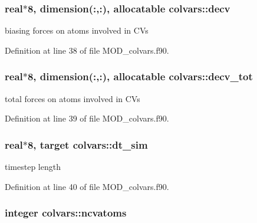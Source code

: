 \hypertarget{classcolvars_aae9ea8e5b352351931e03775fc3971e2}{
\subsubsection[{decv}]{\setlength{\rightskip}{0pt plus 5cm}real$\ast$8, dimension(\-:,\-:), allocatable colvars\-::decv}}\label{classcolvars_aae9ea8e5b352351931e03775fc3971e2}


biasing forces on atoms involved in C\-Vs 



Definition at line 38 of file M\-O\-D\-\_\-colvars.\-f90.

\hypertarget{classcolvars_a40f16d6e6e70120635372cfb5e81d4be}{
\subsubsection[{decv\-\_\-tot}]{\setlength{\rightskip}{0pt plus 5cm}real$\ast$8, dimension(\-:,\-:), allocatable colvars\-::decv\-\_\-tot}}\label{classcolvars_a40f16d6e6e70120635372cfb5e81d4be}


total forces on atoms involved in C\-Vs 



Definition at line 39 of file M\-O\-D\-\_\-colvars.\-f90.

\hypertarget{classcolvars_a5354676077248821a35dee43812d4eee}{
\subsubsection[{dt\-\_\-sim}]{\setlength{\rightskip}{0pt plus 5cm}real$\ast$8, target colvars\-::dt\-\_\-sim}}\label{classcolvars_a5354676077248821a35dee43812d4eee}


timestep length 



Definition at line 40 of file M\-O\-D\-\_\-colvars.\-f90.

\hypertarget{classcolvars_ac61dbb2d19dcefc1fbe755db1f35b688}{
\subsubsection[{ncvatoms}]{\setlength{\rightskip}{0pt plus 5cm}integer colvars\-::ncvatoms}}\label{classcolvars_ac61dbb2d19dcefc1fbe755db1f35b688}


